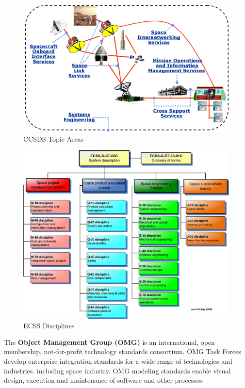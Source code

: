 \begin{figure}[h]
\centering\includegraphics[scale=0.6]{fig/ccsds_topic_areas}
\caption{CCSDS Topic Areas}
\label{fig:CCSDS Topic Areas}
\end{figure}

\begin{figure}[h]
\centering\includegraphics[scale=0.38]{fig/ecss_disciplines}
\caption{ECSS Disciplines}
\label{fig:ECSS Disciplines}
\end{figure}

The \textbf{Object Management Group (OMG)} \cite{omg.org} is an international, open membership, not-for-profit technology standards consortium. OMG Task Forces develop enterprise integration standards for a wide range of technologies and industries. including space industry. OMG modeling standards enable visual design, execution and maintenance of software and other processes. 

